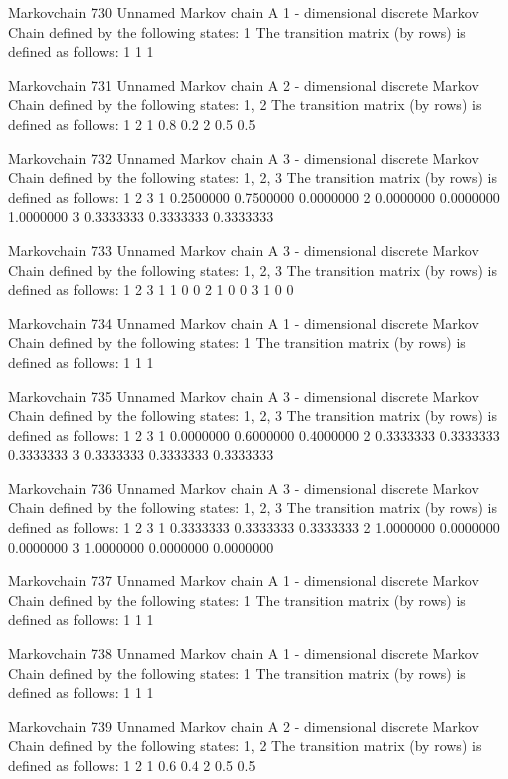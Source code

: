 \documentclass[
  nojss]{jss}
\begin{document}
\begin{CodeChunk}
\begin{CodeOutput}
Markovchain  730 
Unnamed Markov chain 
 A  1 - dimensional discrete Markov Chain defined by the following states: 
 1 
 The transition matrix  (by rows)  is defined as follows: 
  1
1 1

Markovchain  731 
Unnamed Markov chain 
 A  2 - dimensional discrete Markov Chain defined by the following states: 
 1, 2 
 The transition matrix  (by rows)  is defined as follows: 
    1   2
1 0.8 0.2
2 0.5 0.5

Markovchain  732 
Unnamed Markov chain 
 A  3 - dimensional discrete Markov Chain defined by the following states: 
 1, 2, 3 
 The transition matrix  (by rows)  is defined as follows: 
          1         2         3
1 0.2500000 0.7500000 0.0000000
2 0.0000000 0.0000000 1.0000000
3 0.3333333 0.3333333 0.3333333

Markovchain  733 
Unnamed Markov chain 
 A  3 - dimensional discrete Markov Chain defined by the following states: 
 1, 2, 3 
 The transition matrix  (by rows)  is defined as follows: 
  1 2 3
1 1 0 0
2 1 0 0
3 1 0 0

Markovchain  734 
Unnamed Markov chain 
 A  1 - dimensional discrete Markov Chain defined by the following states: 
 1 
 The transition matrix  (by rows)  is defined as follows: 
  1
1 1

Markovchain  735 
Unnamed Markov chain 
 A  3 - dimensional discrete Markov Chain defined by the following states: 
 1, 2, 3 
 The transition matrix  (by rows)  is defined as follows: 
          1         2         3
1 0.0000000 0.6000000 0.4000000
2 0.3333333 0.3333333 0.3333333
3 0.3333333 0.3333333 0.3333333

Markovchain  736 
Unnamed Markov chain 
 A  3 - dimensional discrete Markov Chain defined by the following states: 
 1, 2, 3 
 The transition matrix  (by rows)  is defined as follows: 
          1         2         3
1 0.3333333 0.3333333 0.3333333
2 1.0000000 0.0000000 0.0000000
3 1.0000000 0.0000000 0.0000000

Markovchain  737 
Unnamed Markov chain 
 A  1 - dimensional discrete Markov Chain defined by the following states: 
 1 
 The transition matrix  (by rows)  is defined as follows: 
  1
1 1

Markovchain  738 
Unnamed Markov chain 
 A  1 - dimensional discrete Markov Chain defined by the following states: 
 1 
 The transition matrix  (by rows)  is defined as follows: 
  1
1 1

Markovchain  739 
Unnamed Markov chain 
 A  2 - dimensional discrete Markov Chain defined by the following states: 
 1, 2 
 The transition matrix  (by rows)  is defined as follows: 
    1   2
1 0.6 0.4
2 0.5 0.5


\end{CodeOutput}
\end{CodeChunk}
\end{document}
